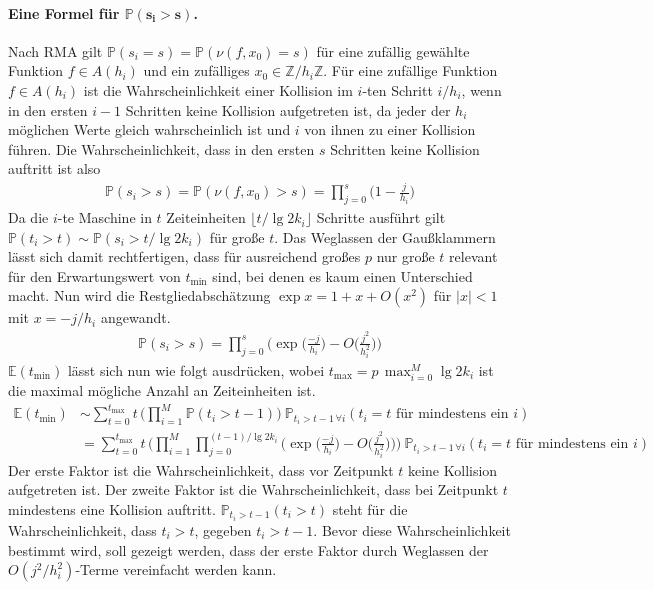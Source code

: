 \documentclass[a4paper, 10pt, ngerman]{article}
\newcommand{\E}{\mathbb{E}}
\newcommand{\Z}{\mathbb{Z}}
\renewcommand{\P}{\mathbb{P}}
\begin{document}
\paragraph{Eine Formel für $\pmb{\P(s_i > s)}$.} Nach RMA gilt $\P(s_i = s) = \P(\nu(f, x_0) = s)$ für eine zufällig gewählte Funktion $f \in A(h_i)$ und ein zufälliges $x_0 \in \Z/h_i\Z$. Für eine zufällige Funktion $f \in A(h_i)$ ist die Wahrscheinlichkeit einer Kollision im $i$-ten Schritt $i/h_i$, wenn in den ersten $i-1$ Schritten keine Kollision aufgetreten ist, da jeder der $h_i$ möglichen Werte gleich wahrscheinlich ist und $i$ von ihnen zu einer Kollision führen. Die Wahrscheinlichkeit, dass in den ersten $s$ Schritten keine Kollision auftritt ist also
\begin{align*}
    \P(s_i > s)
    = \P(\nu(f, x_0) > s)
    = \prod_{j = 0}^s \bigg (1 - \frac {j} {h_i} \bigg )
\end{align*}
Da die $i$-te Maschine in $t$ Zeiteinheiten $\lfloor t / \lg 2k_i \rfloor$ Schritte ausführt gilt $\P(t_i > t) \sim \P(s_i > t / \lg 2k_i)$ für große $t$. Das Weglassen der Gaußklammern lässt sich damit rechtfertigen, dass für ausreichend großes $p$ nur große $t$ relevant für den Erwartungswert von $t_{\min}$ sind, bei denen es kaum einen Unterschied macht. Nun wird die Restgliedabschätzung $\exp x = 1 + x + O(x^2)$ für $|x| < 1$ mit $x = -j/h_i$ angewandt.
\begin{align*}
    \P(s_i > s)
    = \prod_{j = 0}^{s} \Bigg ( \exp \bigg ( \frac {-j}{h_i} \bigg )
    - O \bigg ( \frac {j^2} {h_i^2} \bigg ) \Bigg )
\end{align*}
$\E(t_{\min})$ lässt sich nun wie folgt ausdrücken, wobei $t_{\max} = p \, \max_{i = 0}^M \lg 2k_i$ ist die maximal mögliche Anzahl an Zeiteinheiten ist.
\begin{align*}
    \E(t_{\min})
     & \sim \sum_{t = 0}^{t_{\max}} t \,
    \Bigg ( \prod_{i = 1}^M \P(t_i > t - 1) \Bigg ) \
    \P_{t_i > t - 1 \, \forall i}(t_i = t \text{ für mindestens ein } i) \\
     & = \sum_{t = 0}^{t_{\max}} t \,
    \Bigg ( \prod_{i = 1}^M \prod_{j = 0}^{(t-1) / \lg 2k_i}
    \Bigg ( \exp \bigg ( \frac {-j}{h_i} \bigg )
        - O \bigg ( \frac {j^2} {h_i^2} \bigg ) \Bigg )\Bigg ) \
    \P_{t_i > t - 1 \, \forall i}(t_i = t \text{ für mindestens ein } i)
\end{align*}
Der erste Faktor ist die Wahrscheinlichkeit, dass vor Zeitpunkt $t$ keine Kollision aufgetreten ist. Der zweite Faktor ist die Wahrscheinlichkeit, dass bei Zeitpunkt $t$ mindestens eine Kollision auftritt. $\P_{t_i > t - 1}(t_i > t)$ steht für die Wahrscheinlichkeit, dass $t_i > t$, gegeben $t_i > t - 1$. Bevor diese Wahrscheinlichkeit bestimmt wird, soll gezeigt werden, dass der erste Faktor durch Weglassen der $O(j^2/h_i^2)$-Terme vereinfacht werden kann.
\end{document}
